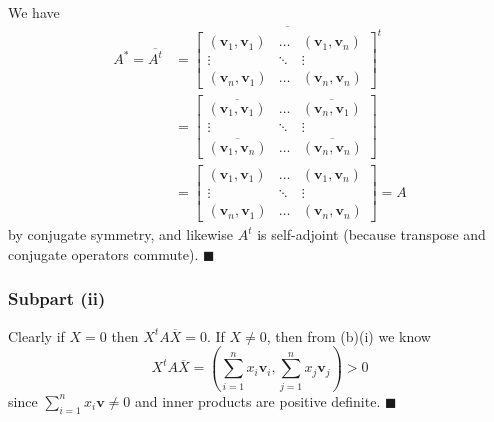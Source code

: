 \documentclass[12pt]{article}
\begin{document}
We have \begin{align*}
    A^*=\overline{A^t}&=\overline{
    \begin{bmatrix} (\mathbf{v}_1,\mathbf{v}_1)
        &\ldots
    &(\mathbf{v}_1,\mathbf{v}_n)
        \\ \vdots&\ddots&\vdots\\
    (\mathbf{v}_n,\mathbf{v}_1)&\ldots&(\mathbf{v}_n,\mathbf{v}_n)
    \end{bmatrix}^t 
    }
                    \\&=
    \begin{bmatrix} \overline{(\mathbf{v}_1,\mathbf{v}_1)}
        &\ldots
        &\overline{(\mathbf{v}_n,\mathbf{v}_1)}
        \\ \vdots&\ddots&\vdots\\
        \overline{(\mathbf{v}_1,\mathbf{v}_n)}
                 &\ldots&\overline{(\mathbf{v}_n,\mathbf{v}_n)}
    \end{bmatrix}
                    \\&=
    \begin{bmatrix} (\mathbf{v}_1,\mathbf{v}_1)
        &\ldots
        &(\mathbf{v}_1,\mathbf{v}_n)
        \\ \vdots&\ddots&\vdots\\
    (\mathbf{v}_n,\mathbf{v}_1)&\ldots&(\mathbf{v}_n,\mathbf{v}_n)
    \end{bmatrix}=A 
\end{align*}
by conjugate symmetry, and likewise $A^t$ is self-adjoint (because transpose
and conjugate operators commute).
\hfill$\blacksquare$

\subsubsection*{Subpart (ii)}
Clearly if $X=0$ then $X^tA\overline{X}=0$. If $X\neq 0$, then
from (b)(i) we know
\[
    X^tA\overline{X}=
    \left(\sum_{i=1}^nx_i\mathbf{v}_i, \sum_{j=1}^nx_j\mathbf{v}_j\right)
    >0
\]
since $\sum_{i=1}^nx_i\mathbf{v}\neq 0$ and inner products are positive definite.
\hfill$\blacksquare$
\end{document}
